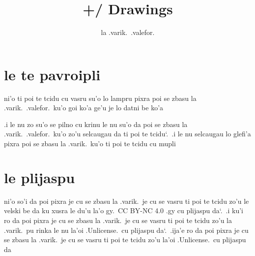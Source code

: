 \documentclass{report}
\title{+/ Drawings}
\author{la .varik.\ .valefor.}
\newcommand\sds{\spacefactor\sfcode`.\ \space}
\begin{document}
\maketitle{}
\tableofcontents{}
\chapter{le te pavroipli}
ni'o ti poi te tcidu cu vasru su'o lo lampru pixra poi se zbasu la .varik.\ .valefor.\ ku'o goi ko'a ge'u je lo datni be ko'a

.i le nu zo su'o se pilno cu krinu le nu su'o da poi se zbasu la .varik.\ .valefor.\ ku'o zo'u selcaugau da ti poi te tcidu\sds  .i le nu selcaugau lo glefi'a pixra poi se zbasu la .varik.\ ku'o ti poi te tcidu cu mupli

\chapter{le plijaspu}
ni'o so'i da poi pixra je cu se zbasu la .varik.\ je cu se vasru ti poi te tcidu zo'u le velski be da ku xusra le du'u la'o gy.\ CC BY-NC 4.0 .gy cu plijaspu da\sds  .i ku'i ro da poi pixra je cu se zbasu la .varik.\ je cu se vasru ti poi te tcidu zo'u la .varik.\ pu rinka le nu la'oi .Unlicense.\ cu plijaspu da\sds  .ija'e ro da poi pixra je cu se zbasu la .varik.\ je cu se vasru ti poi te tcidu zo'u la'oi .Unlicense.\ cu plijaspu da
\end{document}
